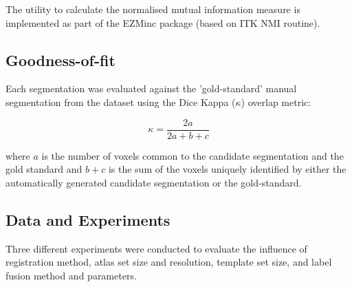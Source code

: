 \documentclass{article}\usepackage{graphicx, color}
\newcommand{\marginnote}[1]{\-\marginpar[\raggedleft\footnotesize #1]{\raggedright\footnotesize #1}}
\newcommand{\todo}[1]{\marginnote{\textcolor{red}{TODO #1}}}
\begin{document}
The utility to calculate the normalised mutual information measure is
implemented as part of the EZMinc package (based on ITK NMI routine).

\subsection{Goodness-of-fit}

Each segmentation was evaluated against the 'gold-standard' manual segmentation
from the dataset using the Dice Kappa ($\kappa$) overlap metric:

\begin{equation*} 
\kappa=\frac{2a}{2a+b+c}
\end{equation*}

where $a$ is the number of voxels common to the candidate segmentation and the
gold standard and $b+c$ is the sum of the voxels uniquely identified by either
the automatically generated candidate segmentation or the gold-standard.
\todo{I would do this after you define the experiments}

\subsection{Data and Experiments}

Three different experiments were conducted to evaluate the influence of
registration method, atlas set size and resolution, template set size, and
label fusion method and parameters.
\end{document}
